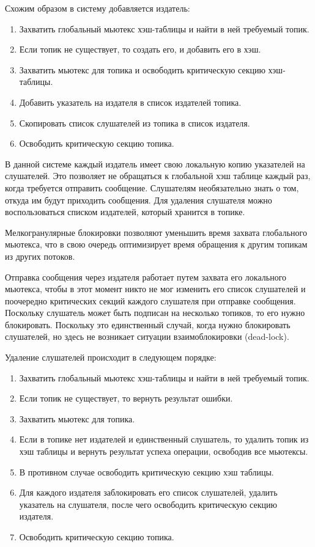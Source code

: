 Схожим образом в систему добавляется издатель:

\begin{enumerate}
	\item Захватить глобальный мьютекс хэш-таблицы и найти в ней требуемый топик.
	\item Если топик не существует, то создать его, и добавить его в хэш.
	\item Захватить мьютекс для топика и освободить критическую секцию хэш-таблицы.
	\item Добавить указатель на издателя в список издателей топика.
	\item Скопировать список слушателей из топика в список издателя.
	\item Освободить критическую секцию топика.
\end{enumerate}

В данной системе каждый издатель имеет свою локальную копию указателей на слушателей. Это позволяет не обращаться к глобальной хэш таблице каждый раз, когда требуется отправить сообщение. Слушателям необязательно знать о том, откуда им будут приходить сообщения. Для удаления слушателя можно воспользоваться списком издателей, который хранится в топике.

Мелкогранулярные блокировки позволяют уменьшить время захвата глобального мьютекса, что в свою очередь оптимизирует время обращения к другим топикам из других потоков.

Отправка сообщения через издателя работает путем захвата его локального мьютекса, чтобы в этот момент никто не мог изменить его список слушателей и поочередно критических секций каждого слушателя при отправке сообщения. Поскольку слушатель может быть подписан на несколько топиков, то его нужно блокировать. Поскольку это единственный случай, когда нужно блокировать слушателей, но здесь не возникает ситуации взаимоблокировки (dead-lock).

Удаление слушателей происходит в следующем порядке:

\begin{enumerate}
	\item Захватить глобальный мьютекс хэш-таблицы и найти в ней требуемый топик.
	\item Если топик не существует, то вернуть результат ошибки.
	\item Захватить мьютекс для топика.
	\item Если в топике нет издателей и единственный слушатель, то удалить топик из хэш таблицы и вернуть результат успеха операции, освободив все мьютексы.
	\item В противном случае освободить критическую секцию хэш таблицы.
	\item Для каждого издателя заблокировать его список слушателей, удалить указатель на слушателя, после чего освободить критическую секцию издателя.
	\item Освободить критическую секцию топика.
\end{enumerate}

